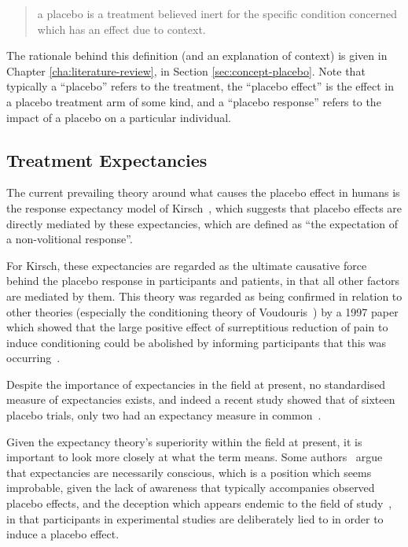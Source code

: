 \begin{quotation}
  a placebo is a treatment believed inert for the specific condition
  concerned which has an effect due to context.
\end{quotation}

The rationale behind this definition (and an explanation of context) is given in Chapter \ref{cha:literature-review}, in Section \ref{sec:concept-placebo}. Note that typically a ``placebo'' refers to the treatment, the ``placebo effect'' is the effect in a placebo treatment arm of some kind, and a ``placebo response'' refers to the impact of a placebo on a particular individual.



\subsection{Treatment Expectancies}
\label{sec:placebo-expectancies}

The current prevailing theory around what causes the placebo effect in humans is the response expectancy model of Kirsch~\cite{Kirsch1985,Kirsch1997}, which suggests that placebo effects are directly mediated by these expectancies, which are defined as ``the expectation of a non-volitional response''.

For Kirsch, these expectancies are regarded as the ultimate causative force behind the placebo response in participants and patients, in that all other factors are mediated by them. This theory was regarded as being confirmed in relation to other theories (especially the conditioning theory of Voudouris~\cite{Voudouris1985}) by a 1997 paper which showed that the large positive effect of surreptitious reduction of pain to induce conditioning could be abolished by informing participants that this was occurring~\cite{Montgomery1997}.

Despite the importance of expectancies in the field at present, no standardised measure of expectancies exists, and indeed a recent study showed that of sixteen placebo trials, only two had an expectancy measure in common~\cite{myers2008patient}. 

Given the expectancy theory's superiority within the field at present, it is important to look more closely at what the term means. Some authors~\cite{Stewart-Williams2004a}  argue that expectancies are necessarily conscious, which is a position which seems improbable, given the lack of awareness that typically accompanies observed placebo effects, and the deception which appears endemic to the field of study~\cite{Miller2008a,Miller2008}, in that participants in experimental studies are deliberately lied to in order to induce a placebo effect. 

